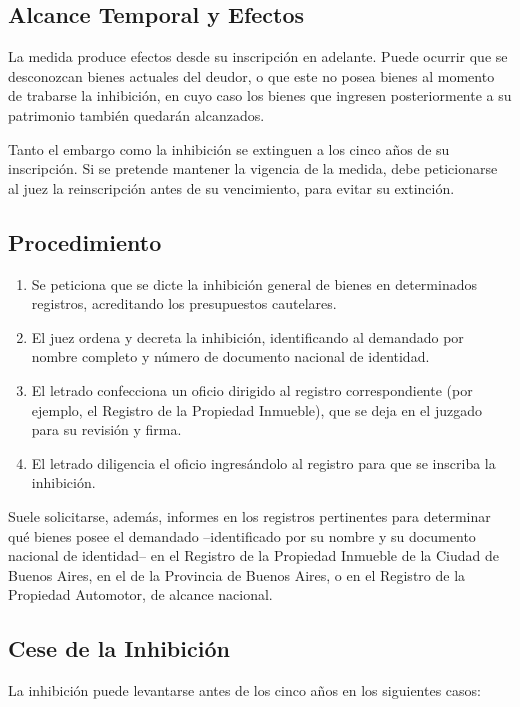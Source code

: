 \documentclass[12pt,oneside]{book}
\begin{document}
\subsection{Alcance Temporal y Efectos}

La medida produce efectos desde su inscripción en adelante. Puede ocurrir que se desconozcan bienes actuales del deudor, o que este no posea bienes al momento de trabarse la inhibición, en cuyo caso los bienes que ingresen posteriormente a su patrimonio también quedarán alcanzados.

Tanto el embargo como la inhibición se extinguen a los cinco años de su inscripción. Si se pretende mantener la vigencia de la medida, debe peticionarse al juez la reinscripción antes de su vencimiento, para evitar su extinción.

\subsection{Procedimiento}

\begin{enumerate}
    \item Se peticiona que se dicte la inhibición general de bienes en determinados registros, acreditando los presupuestos cautelares.
    \item El juez ordena y decreta la inhibición, identificando al demandado por nombre completo y número de documento nacional de identidad.
    \item El letrado confecciona un oficio dirigido al registro correspondiente (por ejemplo, el Registro de la Propiedad Inmueble), que se deja en el juzgado para su revisión y firma.
    \item El letrado diligencia el oficio ingresándolo al registro para que se inscriba la inhibición.
\end{enumerate}

Suele solicitarse, además, informes en los registros pertinentes para determinar qué bienes posee el demandado --identificado por su nombre y su documento nacional de identidad-- en el Registro de la Propiedad Inmueble de la Ciudad de Buenos Aires, en el de la Provincia de Buenos Aires, o en el Registro de la Propiedad Automotor, de alcance nacional.

\subsection{Cese de la Inhibición}

La inhibición puede levantarse antes de los cinco años en los siguientes casos:
\end{document}
